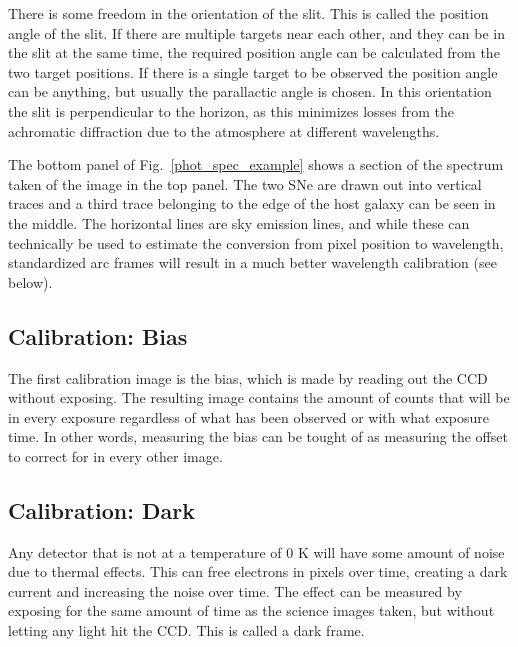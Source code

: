 \documentclass[a4paper,oneside,12pt, class=Latex/Classes/PhDthesisPSnPDF, crop=false]{standalone}
\begin{document}
There is some freedom in the orientation of the slit. This is called the position angle of the slit. If there are multiple targets near each other, and they can be in the slit at the same time, the required position angle can be calculated from the two target positions. If there is a single target to be observed the position angle can be anything, but usually the parallactic angle is chosen. In this orientation the slit is perpendicular to the horizon, as this minimizes losses from the achromatic diffraction due to the atmosphere at different wavelengths.

The bottom panel of Fig.~\ref{phot_spec_example} shows a section of the spectrum taken of the image in the top panel. The two SNe are drawn out into vertical traces and a third trace belonging to the edge of the host galaxy can be seen in the middle. The horizontal lines are sky emission lines, and while these can technically be used to estimate the conversion from pixel position to wavelength, standardized arc frames will result in a much better wavelength calibration (see below).



\subsection{Calibration: Bias}
The first calibration image is the bias, which is made by reading out the CCD without exposing. The resulting image contains the amount of counts that will be in every exposure regardless of what has been observed or with what exposure time. In other words, measuring the bias can be tought of as measuring the offset to correct for in every other image.


\subsection{Calibration: Dark}
Any detector that is not at a temperature of 0 K will have some amount of noise due to thermal effects. This can free electrons in pixels over time, creating a dark current and increasing the noise over time. The effect can be measured by exposing for the same amount of time as the science images taken, but without letting any light hit the CCD. This is called a dark frame.
\end{document}

